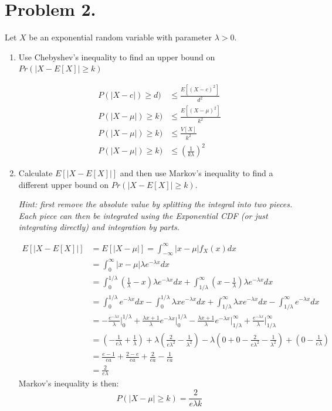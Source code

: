 \documentclass{article}
\newcommand{\1}{\mathbf{1}}
\begin{document}
\section*{Problem 2.}
Let $X$ be an exponential random variable with parameter $\lambda > 0$.
\begin{enumerate}
    \item Use Chebyshev's inequality to find an upper bound on $Pr(|X- E[X] | \geq k)$

    \begin{align*}
        P(|X-c|) \geq d) &\leq \frac{E[(X-c)^2]}{d^2} \\
        P(|X-\mu|) \geq k) &\leq \frac{E[(X-\mu)^2]}{k^2} \\
        P(|X-\mu|) \geq k) &\leq \frac{V[X]}{k^2} \\
        P(|X-\mu|) \geq k) &\leq \left(\frac{1}{k\lambda}\right)^2
    \end{align*}

    \item Calculate $E[ |X - E[X]|]$ and then use Markov's inequality to find a different upper bound on $Pr(|X- E[X] | \geq k)$.\par
    {\it Hint: first remove the absolute value by splitting the integral into two pieces. Each piece can then be integrated using the Exponential CDF (or just integrating directly) and integration by parts.}
    
    \begin{align*}
        E[|X - E[X]|] &= E[|X - \mu|] = \int_{-\infty}^\infty |x-\mu|f_X(x) dx \\
        &= \int_{0}^\infty |x-\mu|\lambda e^{-\lambda x} dx \\
        &= \int_0^{1/\lambda} \left(\frac{1}{\lambda} - x\right)\lambda e^{-\lambda x} dx 
            + \int_{1/\lambda}^\infty \left(x - \frac{1}{\lambda} \right)\lambda e^{-\lambda x} dx \\
        &= \int_0^{1/\lambda} e^{-\lambda x} dx 
            - \int_0^{1/\lambda} \lambda xe^{-\lambda x} dx
            + \int_{1/\lambda}^\infty \lambda  xe^{-\lambda x} dx 
            - \int_{1/\lambda}^\infty e^{-\lambda x} dx \\
        &= -\frac{e^{-\lambda x}}{\lambda} \bigg|_0^{1/\lambda} 
            + \frac{\lambda x+1}{\lambda}e^{-\lambda x} \bigg|_0^{1/\lambda}
            - \frac{\lambda x+1}{\lambda}e^{-\lambda x} \bigg|_{1/\lambda}^\infty 
            + \frac{e^{-\lambda x}}{\lambda} \bigg|_{1/\lambda}^\infty \\
        &= \left(-\frac{1}{e\lambda}+ \frac{1}{\lambda}\right) 
            + \lambda \left(\frac{2}{e\lambda^2} - \frac{1}{\lambda^2} \right) 
            - \lambda \left(0 + 0 - \frac{2}{e\lambda^2} - \frac{1}{\lambda^2}\right) 
            + \left(0 - \frac{1}{e\lambda}\right) \\
        &= \frac{e-1}{ea} 
           + \frac{2-e}{ea} 
           + \frac{2}{ea}
           - \frac{1}{ea} \\
        &= \frac{2}{e\lambda}
    \end{align*}
    Markov's inequality is then:
    $$P(|X-\mu|\geq k) = \frac{2}{e \lambda k}$$


\end{enumerate}
\end{document}
